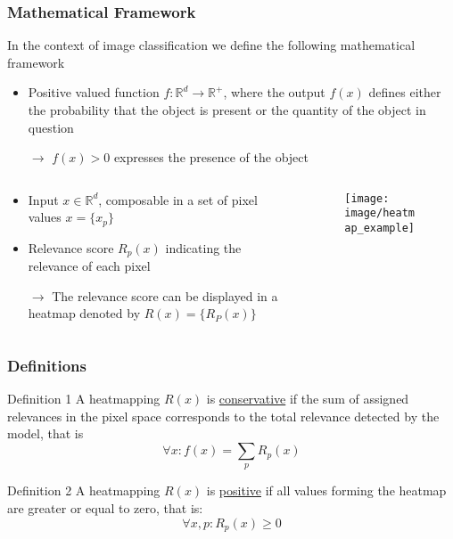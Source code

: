 \documentclass{beamer}
\begin{document}
\begin{frame}
\frametitle{Mathematical Framework}

In the context of image classification we define the following mathematical framework
\begin{itemize}
\item Positive valued function $f:\mathbb{R}^d\to \mathbb{R}^+$, where the output $f(x)$ defines either the probability that the object is present or the quantity of the object in question
\item[$\rightarrow$] $f(x)>0$ expresses the presence of the object  


\end{itemize}

 \begin{columns}
          \begin{column}[T]{8cm}
          		\begin{itemize}
          		\item Input $x \in \mathbb{R}^d$, composable in a set of pixel values $x=\{x_p\}$
			\item Relevance score $R_p(x)$ indicating the relevance of each pixel
			\item[$\rightarrow$] The relevance score can be displayed in a heatmap denoted by $R(x) = \{R_P(x)\}$
			\end{itemize}

            \end{column} 
            \begin{column}[T]{3.5cm}
			\begin{figure}
			\texttt{[image: image/heatmap\_example]}
			\end{figure}
	\end{column}
\end{columns} 

\end{frame}



\begin{frame}
\frametitle{Definitions}
\begin{block}{Definition 1}
A heatmapping $R(x)$ is \underline{conservative} if the sum of assigned relevances in the pixel space corresponds to the total relevance detected by the model, that is
\begin{equation}
\forall x: f(x)=\sum_pR_p(x)
\end{equation}
\end{block}

\vspace{0.5cm}

\begin{block}{Definition 2}
A heatmapping $R(x)$ is  \underline{positive} if all values forming the heatmap are greater or equal to zero, that is:
\begin{equation}
\forall x,p: R_p(x) \geq 0
\end{equation}
\end{block}

\end{frame}
\end{document}
